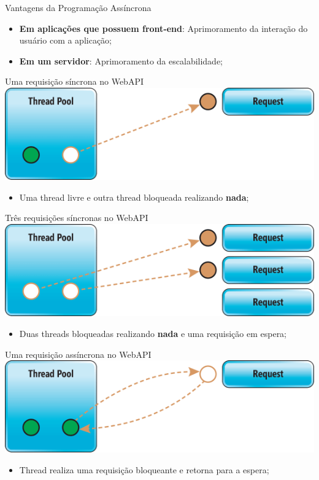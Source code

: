 \documentclass[10pt]{beamer}
\begin{document}
\begin{frame}{Vantagens da Programação Assíncrona}
	\begin{itemize}
		\item \textbf{Em aplicações que possuem front-end}: Aprimoramento da interação do usuário com a aplicação; 
		\item \textbf{Em um servidor}: Aprimoramento da escalabilidade;
	\end{itemize}
\end{frame}

\begin{frame}{Uma requisição síncrona no WebAPI}
	\includegraphics[width=\textwidth]{imgs/sync1}
	\begin{itemize}
		\item Uma thread livre e outra thread bloqueada realizando \textbf{nada};
	\end{itemize}
\end{frame}

\begin{frame}{Três requisições síncronas no WebAPI}
	\includegraphics[width=\textwidth]{imgs/sync2}
	\begin{itemize}
		\item Duas threads bloqueadas realizando \textbf{nada} e uma requisição em espera;
	\end{itemize}
\end{frame}

\begin{frame}{Uma requisição assíncrona no WebAPI}
	\includegraphics[width=\textwidth]{imgs/async}
	\begin{itemize}
		\item Thread realiza uma requisição bloqueante e retorna para a espera;
	\end{itemize}
\end{frame}
\end{document}
